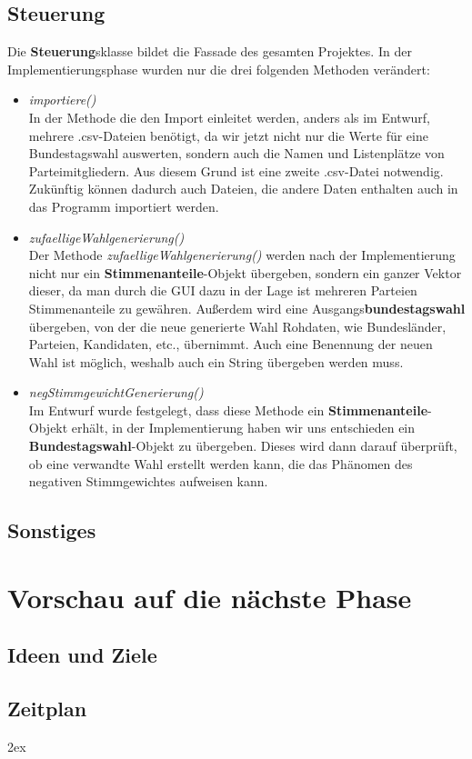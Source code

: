 \documentclass[12pt,a4paper,titlepage]{article}
\newcommand{\myma}{\fontfamily{pcr}\selectfont \textbf}
\newcommand{\mymo}{\fontfamily{pcr}\selectfont \textit}
\begin{document}
\subsection{Steuerung}
Die {\myma{Steuerung}}sklasse bildet die Fassade des gesamten Projektes. In der Implementierungsphase wurden nur die drei folgenden Methoden verändert:
\begin{itemize}
\item {\mymo{importiere()}}\\
In der Methode die den Import einleitet werden, anders als im Entwurf, mehrere .csv-Dateien benötigt, da wir jetzt nicht nur die Werte für eine Bundestagswahl auswerten, sondern auch die Namen und Listenplätze von Parteimitgliedern. 
Aus diesem Grund ist eine zweite .csv-Datei notwendig.\\
Zukünftig können dadurch auch Dateien, die andere Daten enthalten auch in das Programm importiert werden.\\
 
\item {\mymo{zufaelligeWahlgenerierung()}}\\
Der Methode {\mymo{zufaelligeWahlgenerierung()}} werden nach der Implementierung nicht nur ein {\myma{Stimmenanteile}}-Objekt übergeben, sondern ein ganzer Vektor dieser, da man durch die GUI dazu in der Lage ist
mehreren Parteien Stimmenanteile zu gewähren. Außerdem wird eine Ausgangs{\myma{bundestagswahl}} übergeben, von der die neue generierte Wahl Rohdaten, wie Bundesländer, Parteien, Kandidaten, etc., übernimmt. Auch eine Benennung der neuen Wahl ist möglich, weshalb auch ein String übergeben werden muss.\\

\item {\mymo{negStimmgewichtGenerierung()}}\\
Im Entwurf wurde festgelegt, dass diese Methode ein {\myma{Stimmenanteile}}-Objekt erhält, in der Implementierung haben wir uns entschieden ein {\myma{Bundestagswahl}}-Objekt zu übergeben. Dieses wird dann darauf überprüft, ob eine verwandte Wahl erstellt werden kann, die das Phänomen des negativen Stimmgewichtes aufweisen kann. \\

\end{itemize}
	
	\subsection{Sonstiges}

\section{Vorschau auf die nächste Phase}

	\subsection{Ideen und Ziele}

	\subsection{Zeitplan}
	
\begingroup
\parindent 0pt
\parskip 2ex
\def\enotesize{\normalsize}

\endgroup
\end{document}
